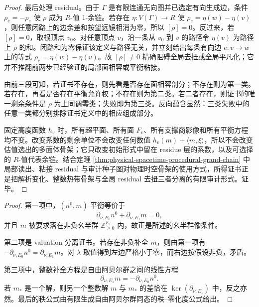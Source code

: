 \begin{proof}
最后处理 residual。由于 \(\Gamma\) 是有限连通无向图并已选定有向生成边，条件 \(\rho_{\bar e}=-\rho_e\) 使 \(\rho\) 成为 \(R\)-值 \(1\)-余链。若存在 \(\eta:V(\Gamma)\to R\) 使 \(\rho_e=\eta(w)-\eta(v)\)，则任意闭路上的边余差和按望远镜相消为零，所以 \([\rho]=0\)。反过来，若 \([\rho]=0\)，取根顶点 \(v_0\)。对任意顶点 \(v\)，沿一条从 \(v_0\) 到 \(v\) 的路径令 \(\eta(v)\) 为路径上 \(\rho\) 的和。闭路和为零保证该定义与路径无关，并立刻给出每条有向边 \(e:v\to w\) 上的等式 \(\rho_e=\eta(w)-\eta(v)\)。故 \([\rho]\ne0\) 精确阻碍全局去扭或全局平凡化；它并不推翻前两步已经验证的局部面相容或平衡粘接。

由前三段可知，若证书不存在，则先看是否存在面相容剖分；不存在则为第一类。若存在，再看是否存在平衡允许权；不存在则为第二类。若二者存在，则证书的唯一剩余条件是 \(\rho\) 为上同调零类；失败即为第三类。反向蕴含显然：三类失败中的任意一类都分别排除证书定义中的相应组成部分。

固定高度函数 \(h_v\) 时，所有超平面、所有面 \(F_v\)、所有支撑商影像和所有平衡方程均不变。改变系数的剩余单位不会改变任何数值 \(h_v(m)+\langle m,\xi\rangle\)，所以不会改变估值选出的多面体骨架；它只改变初始形式中留在 residue 层的系数，以及可选择的 \(R\)-值代表余链。结合定理 \ref{thm:physical-spacetime-procedural-grand-chain} 中局部读出、粘接 residual 与审计种子图对物理时空骨架的使用方式，所得证书正是把解析变化、整数热带骨架与全局 residual 去扭三者分离的有限审计形式。证毕。
\end{proof}

\begin{proof}
第一项中，\((n^0,m)\) 平衡等价于
\[
\partial_{\nu,E_0}n^0+\partial_{\nu,E_1}m=0,
\]
并且 \(m\) 被要求落在非负幺半群 \(\mathbb Z_{\ge0}^{E_1}\) 内，故正是所述的幺半群像条件。

第二项是 valuation 分离证书。若存在非负补全 \(m\)，则由第一项有
\(-\partial_{\nu,E_0}n^0=\partial_{\nu,E_1}m\)。对 \(\lambda\) 取值得到左边严格小于零，而右边按假设非负，矛盾。

第三项中，整数补全方程是自由阿贝尔群之间的线性方程
\[
\partial_{\nu,E_1}m=-\partial_{\nu,E_0}n^0.
\]
若 \(m_\ast\) 是一个解，则另一个整数解 \(m\) 与 \(m_\ast\) 的差恰在 \(\ker(\partial_{\nu,E_1})\) 中，反之亦然。最后的秩公式由有限生成自由阿贝尔群同态的秩--零化度公式给出。
\end{proof}

